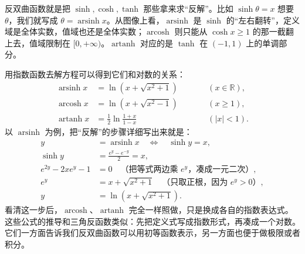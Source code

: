 \documentclass[lang=cn,newtx,10pt,scheme=chinese]{elegantbook}
\DeclareMathOperator{\arsinh}{arsinh}
\DeclareMathOperator{\arcosh}{arcosh}
\DeclareMathOperator{\artanh}{artanh}
\begin{document}
\begin{example}
  
  反双曲函数就是把 $\sinh,\cosh,\tanh$ 那些拿来求“反解”。比如 $\sinh \theta = x$ 想要 $\theta$，我们就写成 $\theta=\arsinh x$。从图像上看，$\arsinh$ 是 $\sinh$ 的“左右翻转”，定义域是全体实数，值域也还是全体实数；$\arcosh$ 则只能从 $\cosh x \ge 1$ 的那一截翻上去，值域限制在 $[0,+\infty)$。$\artanh$ 对应的是 $\tanh$ 在 $(-1,1)$ 上的单调部分。
  
  用指数函数去解方程可以得到它们和对数的关系：
  \begin{align}
    \arsinh x &= \ln\!\left(x + \sqrt{x^{2}+1}\right) \qquad &&(x \in \mathbb{R}), \\
    \arcosh x &= \ln\!\left(x + \sqrt{x^{2}-1}\right) \qquad &&(x \ge 1), \\
    \artanh x &= \frac{1}{2}\ln\!\frac{1+x}{1-x} \qquad &&(|x|<1).
  \end{align}
  以 $\arsinh$ 为例，把“反解”的步骤详细写出来就是：
  \begin{align*}
    y &= \arsinh x \quad \Longleftrightarrow \quad \sinh y = x, \\
    \sinh y &= \frac{e^{y}-e^{-y}}{2} = x, \\
    e^{2y} - 2xe^{y} - 1 &= 0 \quad \text{（把等式两边乘 $e^{y}$，凑成一元二次）}, \\
    e^{y} &= x + \sqrt{x^{2}+1} \quad \text{（只取正根，因为 $e^{y}>0$）}, \\
    y &= \ln\!\left(x+\sqrt{x^{2}+1}\right).
  \end{align*}
  看清这一步后，$\arcosh$、$\artanh$ 完全一样照做，只是换成各自的指数表达式。
  这些公式的推导和三角反函数类似：先把定义式写成指数形式，再凑成一个对数。它们一方面告诉我们反双曲函数可以用初等函数表示，另一方面也便于做极限或者积分。
  

\end{example}
\end{document}
